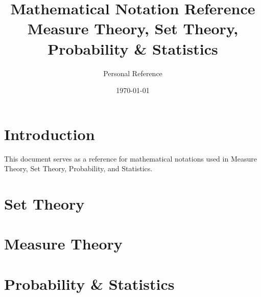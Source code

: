 \documentclass[a4paper,10pt]{article}
\title{\textbf{Mathematical Notation Reference}\\\large Measure Theory, Set Theory, Probability \& Statistics}
\author{Personal Reference}
\date{\today}
\begin{document}
\maketitle

\section{Introduction}
This document serves as a reference for mathematical notations used in Measure Theory, Set Theory, Probability, and Statistics.

\setlength{\tabcolsep}{10pt} %
\renewcommand{\arraystretch}{1.5} %

\section{Set Theory}


\section{Measure Theory}


\section{Probability \& Statistics}

\end{document}
